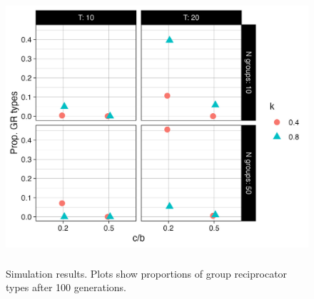 \documentclass[12pt,a4paper]{article}
\begin{document}
\begin{figure}[h]
  \caption{Simulation results. Plots show proportions of group reciprocator types after 100 generations.}
  \label{fig:sims}
  \centering
    \includegraphics[height=4in]{R files/basic-experiment.jpeg}
\end{figure}
\end{document}
